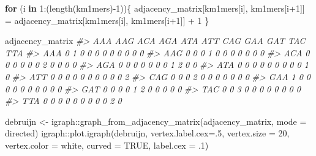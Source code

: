 \documentclass[
]{book}
\newenvironment{Shaded}{\begin{snugshade}}{\end{snugshade}}
\newcommand{\AttributeTok}[1]{\textcolor[rgb]{0.77,0.63,0.00}{#1}}
\newcommand{\CommentTok}[1]{\textcolor[rgb]{0.56,0.35,0.01}{\textit{#1}}}
\newcommand{\ConstantTok}[1]{\textcolor[rgb]{0.00,0.00,0.00}{#1}}
\newcommand{\ControlFlowTok}[1]{\textcolor[rgb]{0.13,0.29,0.53}{\textbf{#1}}}
\newcommand{\DecValTok}[1]{\textcolor[rgb]{0.00,0.00,0.81}{#1}}
\newcommand{\FunctionTok}[1]{\textcolor[rgb]{0.00,0.00,0.00}{#1}}
\newcommand{\NormalTok}[1]{#1}
\newcommand{\OtherTok}[1]{\textcolor[rgb]{0.56,0.35,0.01}{#1}}
\newcommand{\SpecialCharTok}[1]{\textcolor[rgb]{0.00,0.00,0.00}{#1}}
\newcommand{\StringTok}[1]{\textcolor[rgb]{0.31,0.60,0.02}{#1}}
\begin{document}
\begin{Shaded}
\begin{Highlighting}[]
\ControlFlowTok{for}\NormalTok{ (i }\ControlFlowTok{in} \DecValTok{1}\SpecialCharTok{:}\NormalTok{(}\FunctionTok{length}\NormalTok{(km1mers)}\SpecialCharTok{{-}}\DecValTok{1}\NormalTok{))\{}
\NormalTok{  adjacency\_matrix[km1mers[i], km1mers[i}\SpecialCharTok{+}\DecValTok{1}\NormalTok{]] }\OtherTok{=}\NormalTok{ adjacency\_matrix[km1mers[i], km1mers[i}\SpecialCharTok{+}\DecValTok{1}\NormalTok{]] }\SpecialCharTok{+} \DecValTok{1}
\NormalTok{\}}

\NormalTok{adjacency\_matrix}
\CommentTok{\#\textgreater{}     AAA AAG ACA AGA ATA ATT CAG GAA GAT TAC TTA}
\CommentTok{\#\textgreater{} AAA   0   1   0   0   0   0   0   0   0   0   0}
\CommentTok{\#\textgreater{} AAG   0   0   0   1   0   0   0   0   0   0   0}
\CommentTok{\#\textgreater{} ACA   0   0   0   0   0   0   2   0   0   0   0}
\CommentTok{\#\textgreater{} AGA   0   0   0   0   0   0   0   1   2   0   0}
\CommentTok{\#\textgreater{} ATA   0   0   0   0   0   0   0   0   0   1   0}
\CommentTok{\#\textgreater{} ATT   0   0   0   0   0   0   0   0   0   0   2}
\CommentTok{\#\textgreater{} CAG   0   0   0   2   0   0   0   0   0   0   0}
\CommentTok{\#\textgreater{} GAA   1   0   0   0   0   0   0   0   0   0   0}
\CommentTok{\#\textgreater{} GAT   0   0   0   0   1   2   0   0   0   0   0}
\CommentTok{\#\textgreater{} TAC   0   0   3   0   0   0   0   0   0   0   0}
\CommentTok{\#\textgreater{} TTA   0   0   0   0   0   0   0   0   0   2   0}
\end{Highlighting}
\end{Shaded}

\begin{Shaded}
\begin{Highlighting}[]
\NormalTok{debruijn }\OtherTok{\textless{}{-}}\NormalTok{ igraph}\SpecialCharTok{::}\FunctionTok{graph\_from\_adjacency\_matrix}\NormalTok{(adjacency\_matrix, }\AttributeTok{mode =} \StringTok{\textquotesingle{}directed\textquotesingle{}}\NormalTok{)}
\NormalTok{igraph}\SpecialCharTok{::}\FunctionTok{plot.igraph}\NormalTok{(debruijn, }\AttributeTok{vertex.label.cex=}\NormalTok{.}\DecValTok{5}\NormalTok{, }
     \AttributeTok{vertex.size =} \DecValTok{20}\NormalTok{, }\AttributeTok{vertex.color =} \StringTok{\textquotesingle{}white\textquotesingle{}}\NormalTok{,}
     \AttributeTok{curved =} \ConstantTok{TRUE}\NormalTok{, }\AttributeTok{label.cex =}\NormalTok{ .}\DecValTok{1}\NormalTok{)}
\end{Highlighting}
\end{Shaded}
\end{document}
